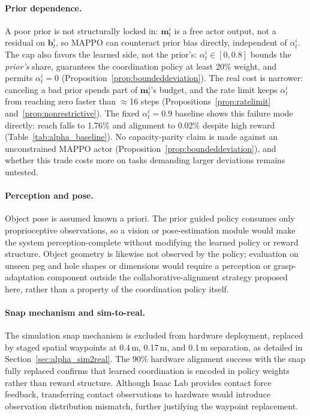 \paragraph{Prior dependence.} A poor prior is not structurally locked in: $\mathbf{m}_t^i$ is a free
actor output, not a residual on $\mathbf{b}_t^i$, so MAPPO can counteract prior bias directly,
independent of $\alpha_t^i$. The cap also favors the learned side, not the prior's: $\alpha_t^i \in
[0,0.8]$ bounds the \emph{prior's} share, guarantees the coordination policy at least 20\% weight, and
permits $\alpha_t^i = 0$ (Proposition~\ref{prop:boundeddeviation}). The real cost is narrower:
canceling a bad prior spends part of $\mathbf{m}_t^i$'s budget, and the rate limit keeps $\alpha_t^i$
from reaching zero faster than $\approx$16 steps (Propositions~\ref{prop:ratelimit}
and~\ref{prop:nonrestrictive}). The fixed $\alpha_t^i = 0.9$ baseline shows this failure mode directly:
reach falls to 1.76\% and alignment to 0.02\% despite high reward (Table~\ref{tab:alpha_baseline}). No
capacity-parity claim is made against an unconstrained MAPPO actor
(Proposition~\ref{prop:boundeddeviation}), and whether this trade costs more on tasks demanding larger
deviations remains untested.

\paragraph{Perception and pose.} Object pose is assumed known a priori. The prior guided policy consumes only
proprioceptive observations, so a vision or pose-estimation module would make the system
perception-complete without modifying the learned policy or reward structure. Object geometry is
likewise not observed by the policy; evaluation on unseen peg and hole shapes or dimensions would
require a perception or grasp-adaptation component outside the collaborative-alignment strategy
proposed here, rather than a property of the coordination policy itself.

\paragraph{Snap mechanism and sim-to-real.} The simulation snap mechanism is excluded from hardware
deployment, replaced by staged spatial waypoints at 0.4\,m, 0.17\,m, and 0.1\,m separation, as detailed
in Section~\ref{sec:alpha_sim2real}. The 90\% hardware alignment success with the snap fully replaced
confirms that learned coordination is encoded in policy weights rather than reward structure. Although
Isaac Lab provides contact force feedback, transferring contact observations to hardware would
introduce observation distribution mismatch, further justifying the waypoint replacement.

